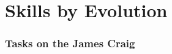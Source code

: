 
\clearpage
\section{Skills by Evolution}

\subsubsection{Tasks on the James Craig}
\begin{multicols}{3}
\startcontents[evolutions]
\footnotesize
{}
\end{multicols}


\stopcontents[evolutions]

